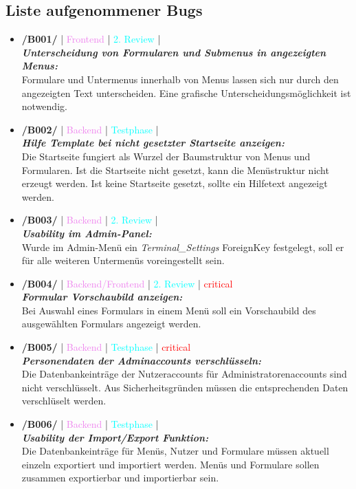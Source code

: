  \subsection{Liste aufgenommener Bugs}
\begin{itemize}
    \item \textbf{/B001/} | \textcolor{violet}{Frontend} | \textcolor{cyan}{2. Review} | \\ \noindent \textit{\textbf{Unterscheidung von Formularen und Submenus in angezeigten Menus:}} \\ \noindent Formulare und Untermenus innerhalb von Menus lassen sich nur durch den angezeigten Text unterscheiden. Eine grafische Unterscheidungsmöglichkeit ist notwendig.
    \item \textbf{/B002/} | \textcolor{violet}{Backend} | \textcolor{cyan}{Testphase} | \\ \noindent \textit{\textbf{Hilfe Template bei nicht gesetzter Startseite anzeigen:}} \\ \noindent Die Startseite fungiert als Wurzel der Baumstruktur von Menus und Formularen. Ist die Startseite nicht gesetzt, kann die Menüstruktur nicht erzeugt werden. Ist keine Startseite gesetzt, sollte ein Hilfetext angezeigt werden.
    \item \textbf{/B003/} | \textcolor{violet}{Backend} | \textcolor{cyan}{2. Review} | \\ \noindent \textit{\textbf{Usability im Admin-Panel:}} \\ \noindent Wurde im Admin-Menü ein \textit{Terminal\_Settings} ForeignKey festgelegt, soll er für alle weiteren Untermenüs voreingestellt sein.
    \item \textbf{/B004/} | \textcolor{violet}{Backend/Frontend} | \textcolor{cyan}{2. Review} | \textcolor{red}{critical}\\ \noindent \textit{\textbf{Formular Vorschaubild anzeigen:}} \\ \noindent Bei Auswahl eines Formulars in einem Menü soll ein Vorschaubild des ausgewählten Formulars angezeigt werden.
    \item \textbf{/B005/} | \textcolor{violet}{Backend} | \textcolor{cyan}{Testphase} | \textcolor{red}{critical}\\ \noindent \textit{\textbf{Personendaten der Adminaccounts verschlüsseln:}} \\ \noindent Die Datenbankeinträge der Nutzeraccounts für Administratorenaccounts sind nicht verschlüsselt. Aus Sicherheitsgründen müssen die entsprechenden Daten verschlüselt werden.
    \item \textbf{/B006/} | \textcolor{violet}{Backend} | \textcolor{cyan}{Testphase} | \\ \noindent \textit{\textbf{Usability der Import/Export Funktion:}} \\ \noindent Die Datenbankeinträge für Menüs, Nutzer und Formulare müssen aktuell einzeln exportiert und importiert werden. Menüs und Formulare sollen zusammen exportierbar und importierbar sein.
\end{itemize}
